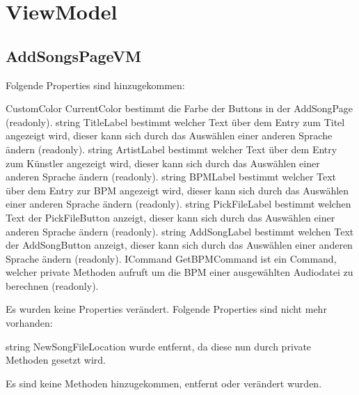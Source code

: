 \documentclass[../implementierung.tex]{subfiles}
\begin{document}
	\section{ViewModel}
		\subsection{AddSongsPageVM}
			Folgende Properties sind hinzugekommen:
			\begin{itemize}
				\add CustomColor CurrentColor bestimmt die Farbe der Buttons in der AddSongPage (readonly).
				\add string TitleLabel bestimmt welcher Text über dem Entry zum Titel angezeigt wird, dieser kann sich durch das Auswählen einer anderen Sprache ändern (readonly).
				\add string ArtistLabel bestimmt welcher Text über dem Entry zum Künstler angezeigt wird, dieser kann sich durch das Auswählen einer anderen Sprache ändern (readonly).
				\add string BPMLabel bestimmt welcher Text über dem Entry zur BPM angezeigt wird, dieser kann sich durch das Auswählen einer anderen Sprache ändern (readonly).
				\add string PickFileLabel bestimmt welchen Text der PickFileButton anzeigt, dieser kann sich durch das Auswählen einer anderen Sprache ändern (readonly).
				\add string AddSongLabel bestimmt welchen Text der AddSongButton anzeigt, dieser kann sich durch das Auswählen einer anderen Sprache ändern (readonly).
				\add ICommand GetBPMCommand ist ein Command, welcher private Methoden aufruft um die BPM einer ausgewählten Audiodatei zu berechnen (readonly).
			\end{itemize}
			Es wurden keine Properties verändert.
			Folgende Properties sind nicht mehr vorhanden:
			\begin{itemize}
				\remove string NewSongFileLocation wurde entfernt, da diese nun durch private Methoden gesetzt wird.
			\end{itemize}
			Es sind keine Methoden hinzugekommen, entfernt oder verändert wurden.
\end{document}
